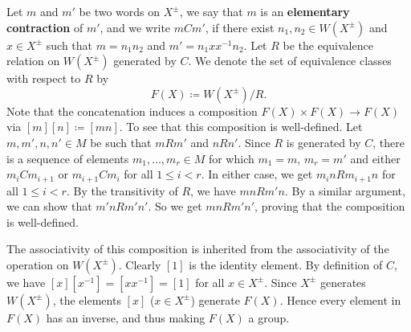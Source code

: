 Let $m$ and $m'$ be two words on $X^{\pm}$, we say that $m$ is an \textbf{elementary contraction} of $m'$, and we write $mCm'$, if there exist $n_1,n_2\in W(X^{\pm})$ and $x\in X^{\pm}$ such that $m = n_1n_2$ and $m' = n_1xx^{-1}n_2$. Let $R$ be the equivalence relation on $W(X^{\pm})$ generated by $C$. We denote the set of equivalence classes with respect to $R$ by
\begin{equation*}
	F(X) \coloneq W(X^{\pm})/R.
\end{equation*}
Note that the concatenation induces a composition $F(X)\times F(X) \to F(X)$ via $[m][n]\coloneq[mn]$. To see that this composition is well-defined. Let $m,m',n,n'\in M$ be such that $mRm'$ and $nRn'$. Since $R$ is generated by $C$, there is a sequence of elements $m_1,\dots, m_r\in M$ for which $m_1=m$, $m_r = m'$ and either $m_iCm_{i+1}$ or  $m_{i+1}Cm_i$ for all $1\leq i<r$. In either case, we get $m_inRm_{i+1}n$ for all $1\leq i<r$. By the transitivity of $R$, we have $mnRm'n$. By a similar argument, we can show that $m'nRm'n'$. So we get $mnRm'n'$, proving that the composition is well-defined. 

The associativity of this composition is inherited from the associativity of the operation on $W(X^{\pm})$. Clearly $[1]$ is the identity element. By definition of $C$, we have $[x][x^{-1}] = [xx^{-1}] = [1]$ for all $x\in X^{\pm}$. Since $X^{\pm}$ generates $W(X^{\pm})$, the elements $[x]$ ($x\in X^{\pm}$) generate $F(X)$. Hence every element in $F(X)$ has an inverse, and thus making $F(X)$ a group.

